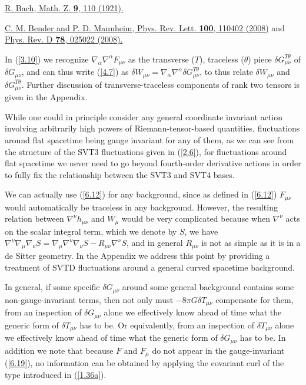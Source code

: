 \documentclass[aps,onecolumn,10pt]{revtex4}
\numberwithin{equation}{section}
\numberwithin{equation}{section}
\begin{document}
\begin{thebibliography}{99}
 \href{https://doi.org/10.1007/BF01378338}{R. Bach, Math. Z.  \textbf{9}, 110 (1921).}

  \href{https://doi.org/10.1103/PhysRevLett.100.110402}{C. M. Bender and P. D. Mannheim, Phys. Rev. Lett. {\bf 100}, 110402 (2008)} and \href{https://doi.org/10.1103/PhysRevD.78.025022} {Phys. Rev. D {\bf 78}, 025022 (2008).}


 In (\ref{3.10}) we recognize $\nabla_{\alpha}\nabla^{\alpha}F_{\mu\nu}$ as the transverse ($T$), traceless ($\theta$) piece $\delta G_{\mu\nu}^{T\theta}$ of $\delta G_{\mu\nu}$, and can thus write (\ref{4.7}) as $\delta W_{\mu\nu}=\nabla_{\alpha}\nabla^{\alpha}\delta G_{\mu\nu}^{T\theta}$, to thus relate $\delta W_{\mu\nu}$ and $\delta G_{\mu\nu}^{T\theta}$. Further discussion of transverse-traceless components of rank two tensors is given in the Appendix.

 While one could in principle consider any general coordinate invariant action involving arbitrarily high powers of Riemann-tensor-based quantities, fluctuations around flat spacetime being  gauge invariant for any of them, as we can see from the structure of the SVT3 fluctuations given in (\ref{2.6}), for fluctuations around flat spacetime we never need to go beyond fourth-order derivative actions in order to fully fix the relationship between the SVT3 and SVT4 bases.

 We can actually use (\ref{6.12}) for any background, since  as defined in (\ref{6.12}) $F_{\mu\nu}$ would automatically be traceless in any background. However, the resulting relation between $\nabla^{\nu}h_{\mu\nu}$ and $W_{\mu}$ would be very complicated because when $\nabla^{\nu}$ acts on the scalar integral  term, which we denote by $S$,  we have $\nabla^{\nu}\nabla_{\mu}\nabla_{\nu}S=\nabla_{\mu}\nabla^{\nu}\nabla_{\nu}S-R_{\mu\nu}\nabla^{\nu}S$, and in general $R_{\mu\nu}$ is not as simple as it is in a de Sitter geometry. In the Appendix we address this point by providing a treatment of SVTD fluctuations around a general curved spacetime background.



 In general, if some specific $\delta G_{\mu\nu}$ around some general background contains some non-gauge-invariant terms, then not only must $-8\pi G\delta T_{\mu\nu}$ compensate for them, from an inspection of $\delta G_{\mu\nu}$ alone we effectively know ahead of time what the generic form of $ \delta T_{\mu\nu}$ has to be. Or equivalently, from an inspection of $\delta T_{\mu\nu}$ alone we effectively know ahead of time what the generic form of $ \delta G_{\mu\nu}$ has to be. In addition we note that because $F$ and $F_{\mu}$ do not appear in the gauge-invariant (\ref{6.19}), no information can be obtained  by applying the covariant curl of the type introduced in (\ref{1.36a}).



\end{thebibliography}
\end{document}
